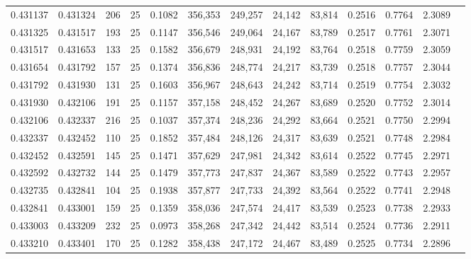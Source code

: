 \begin{tabular}{rrrrrrrrrrrrr}
0.431137 & 0.431324 &   206 &  25 &                                     0.1082 & 356,353 & 249,257 &  24,142 &  83,814 & 0.2516 & 0.7764 & 2.3089 \\
0.431325 & 0.431517 &   193 &  25 &                                     0.1147 & 356,546 & 249,064 &  24,167 &  83,789 & 0.2517 & 0.7761 & 2.3071 \\
0.431517 & 0.431653 &   133 &  25 &                                     0.1582 & 356,679 & 248,931 &  24,192 &  83,764 & 0.2518 & 0.7759 & 2.3059 \\
0.431654 & 0.431792 &   157 &  25 &                                     0.1374 & 356,836 & 248,774 &  24,217 &  83,739 & 0.2518 & 0.7757 & 2.3044 \\
0.431792 & 0.431930 &   131 &  25 &                                     0.1603 & 356,967 & 248,643 &  24,242 &  83,714 & 0.2519 & 0.7754 & 2.3032 \\
0.431930 & 0.432106 &   191 &  25 &                                     0.1157 & 357,158 & 248,452 &  24,267 &  83,689 & 0.2520 & 0.7752 & 2.3014 \\
0.432106 & 0.432337 &   216 &  25 &                                     0.1037 & 357,374 & 248,236 &  24,292 &  83,664 & 0.2521 & 0.7750 & 2.2994 \\
0.432337 & 0.432452 &   110 &  25 &                                     0.1852 & 357,484 & 248,126 &  24,317 &  83,639 & 0.2521 & 0.7748 & 2.2984 \\
0.432452 & 0.432591 &   145 &  25 &                                     0.1471 & 357,629 & 247,981 &  24,342 &  83,614 & 0.2522 & 0.7745 & 2.2971 \\
0.432592 & 0.432732 &   144 &  25 &                                     0.1479 & 357,773 & 247,837 &  24,367 &  83,589 & 0.2522 & 0.7743 & 2.2957 \\
0.432735 & 0.432841 &   104 &  25 &                                     0.1938 & 357,877 & 247,733 &  24,392 &  83,564 & 0.2522 & 0.7741 & 2.2948 \\
0.432841 & 0.433001 &   159 &  25 &                                     0.1359 & 358,036 & 247,574 &  24,417 &  83,539 & 0.2523 & 0.7738 & 2.2933 \\
0.433003 & 0.433209 &   232 &  25 &                                     0.0973 & 358,268 & 247,342 &  24,442 &  83,514 & 0.2524 & 0.7736 & 2.2911 \\
0.433210 & 0.433401 &   170 &  25 &                                     0.1282 & 358,438 & 247,172 &  24,467 &  83,489 & 0.2525 & 0.7734 & 2.2896 \\

\end{tabular}
